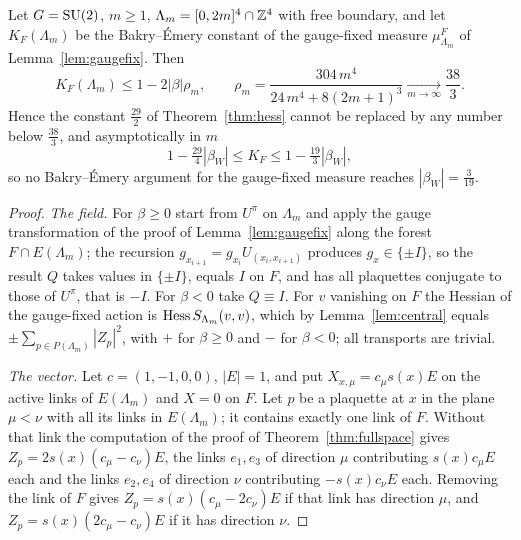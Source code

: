 \begin{theorem}\label{thm:slice}
Let $G=\mathrm{SU}(2)$, $m\ge1$, $\Lambda_m=[0,2m]^4\cap\mathbb{Z}^4$ with free boundary, and
let $K_F(\Lambda_m)$ be the Bakry--\'Emery constant of the gauge-fixed measure
$\mu^F_{\Lambda_m}$ of Lemma~\ref{lem:gaugefix}. Then
\[
K_F(\Lambda_m)\le1-2|\beta|\rho_m,\qquad\rho_m=\frac{304\,m^4}{24\,m^4+8(2m+1)^3}
\xrightarrow[m\to\infty]{}\frac{38}3 .
\]
Hence the constant $\frac{29}2$ of Theorem~\ref{thm:hess} cannot be replaced by
any number below $\frac{38}3$, and asymptotically in $m$
\[
1-\tfrac{29}4|\beta_W|\le K_F\le1-\tfrac{19}3|\beta_W| ,
\]
so no Bakry--\'Emery argument for the gauge-fixed measure reaches $|\beta_W|=
\frac3{19}$.
\end{theorem}

\begin{proof}
\emph{The field.} For $\beta\ge0$ start from $U^\pi$ on $\Lambda_m$ and apply
the gauge transformation of the proof of Lemma~\ref{lem:gaugefix} along the
forest $F\cap E(\Lambda_m)$; the recursion $g_{x_{i+1}}=g_{x_i}U_{(x_i,x_{i+1})}$
produces $g_x\in\{\pm I\}$, so the result $Q$ takes values in $\{\pm I\}$,
equals $I$ on $F$, and has all plaquettes conjugate to those of $U^\pi$, that is
$-I$. For $\beta<0$ take $Q\equiv I$. For $v$ vanishing on $F$ the Hessian of
the gauge-fixed action is $\operatorname{Hess} S_{\Lambda_m}(v,v)$, which by
Lemma~\ref{lem:central} equals $\pm\sum_{p\in P(\Lambda_m)}|Z_p|^2$, with $+$ for
$\beta\ge0$ and $-$ for $\beta<0$; all transports are trivial.

\emph{The vector.} Let $c=(1,-1,0,0)$, $|E|=1$, and put $X_{x,\mu}=c_\mu s(x)E$
on the active links of $E(\Lambda_m)$ and $X=0$ on $F$. Let $p$ be a plaquette at
$x$ in the plane $\mu<\nu$ with all its links in $E(\Lambda_m)$; it contains
exactly one link of $F$. Without that link the computation of the proof of
Theorem~\ref{thm:fullspace} gives $Z_p=2s(x)(c_\mu-c_\nu)E$, the links $e_1,e_3$
of direction $\mu$ contributing $s(x)c_\mu E$ each and the links $e_2,e_4$ of
direction $\nu$ contributing $-s(x)c_\nu E$ each. Removing the link of $F$
gives $Z_p=s(x)(c_\mu-2c_\nu)E$ if that link has direction $\mu$, and $Z_p=
s(x)(2c_\mu-c_\nu)E$ if it has direction $\nu$.


\end{proof}
